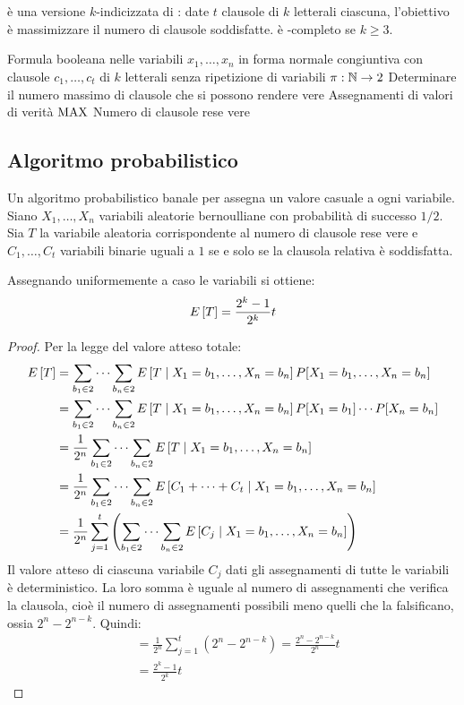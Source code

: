 \section{\MaxEkSat}
\MaxEkSat è una versione $k$-indicizzata di \MaxSat: date $t$ clausole di $k$ letterali ciascuna, l'obiettivo è massimizzare il numero di clausole soddisfatte.
\MaxEkSat è \NPO-completo se $k\geq3$.

\popt
{\MaxEkSat}
{Formula booleana nelle variabili $x_1,\dots,x_n$ in forma normale congiuntiva con clausole $c_1,\dots,c_t$ di $k$ letterali senza ripetizione di variabili}
{$\pi:\mathbb N\to 2$}
{Determinare il numero massimo di clausole che si possono rendere vere}
{Assegnamenti di valori di verità}
{$\mathrm{MAX}$}
{Numero di clausole rese vere}


\subsection{Algoritmo probabilistico}
Un algoritmo probabilistico banale per \MaxEkSat assegna un valore casuale a ogni variabile.
Siano $X_1,\dots,X_n$ variabili aleatorie bernoulliane con probabilità di successo $1/2$.
Sia $T$ la variabile aleatoria corrispondente al numero di clausole rese vere e $C_1,\dots,C_t$ variabili binarie uguali a $1$ se e solo se la clausola relativa è soddisfatta.

\begin{theorem}\label{thm:probassgn}
	Assegnando uniformemente a caso le variabili si ottiene:
	\begin{equation*}
		E\left[T\right] = \frac{2^k-1}{2^k} t
	\end{equation*}
\end{theorem}
\begin{proof}
	Per la legge del valore atteso totale:
	\begin{align*}
		E\left[T\right] & = \sum_{b_1\in2}\dots\sum_{b_n\in2} E\left[T\mid X_1=b_1,\dots,X_n=b_n\right]P[X_1=b_1,\dots,X_n=b_n]                  \\
		       & = \sum_{b_1\in2}\dots\sum_{b_n\in2} E\left[T\mid X_1=b_1,\dots,X_n=b_n\right]P[X_1=b_1]\cdots P[X_n=b_n]               \\
		       & = \frac{1}{2^n}\sum_{b_1\in2}\dots\sum_{b_n\in2} E\left[T\mid X_1=b_1,\dots,X_n=b_n\right]                             \\
		       & = \frac{1}{2^n}\sum_{b_1\in2}\dots\sum_{b_n\in2} E\left[C_1+\dots+C_t\mid X_1=b_1,\dots,X_n=b_n\right]                 \\
		       & = \frac{1}{2^n}\sum_{j=1}^t \left(\sum_{b_1\in2}\dots\sum_{b_n\in2} E\left[C_j\mid X_1=b_1,\dots,X_n=b_n\right]\right) \\
	\end{align*}
	Il valore atteso di ciascuna variabile $C_j$ dati gli assegnamenti di tutte le variabili è deterministico.
	La loro somma è uguale al numero di assegnamenti che verifica la clausola, cioè il numero di assegnamenti possibili meno quelli che la falsificano, ossia $2^n-2^{n-k}$. Quindi:
	\begin{align*}
		 & = \frac{1}{2^n}\sum_{j=1}^t (2^n-2^{n-k})=\frac{2^n-2^{n-k}}{2^n}t \\
		 & = \frac{2^k-1}{2^k}t
	\end{align*}
\end{proof}

